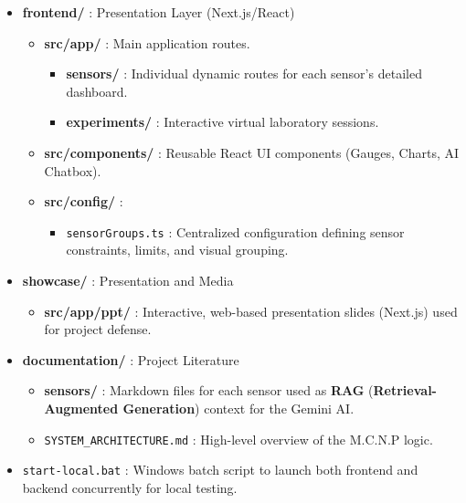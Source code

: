 \documentclass[12pt,a4paper]{article}
\newcommand{\keyword}[1]{\textcolor{keywordcolor}{\textbf{#1}}}
\newcommand{\codeinline}[1]{\texttt{\small #1}}
\begin{document}
\begin{itemize}[label=\textcolor{foldercolor}{\textbf{/}}]
    \item \textbf{\textcolor{foldercolor}{frontend/}} : Presentation Layer (Next.js/React)
    \begin{itemize}[label=--]
        \item \textbf{\textcolor{foldercolor}{src/app/}} : Main application routes.
        \begin{itemize}[label=-]
            \item \textbf{\textcolor{foldercolor}{sensors/}} : Individual dynamic routes for each sensor's detailed dashboard.
            \item \textbf{\textcolor{foldercolor}{experiments/}} : Interactive virtual laboratory sessions.
        \end{itemize}
        \item \textbf{\textcolor{foldercolor}{src/components/}} : Reusable React UI components (Gauges, Charts, AI Chatbox).
        \item \textbf{\textcolor{foldercolor}{src/config/}} : 
        \begin{itemize}[label=-]
            \item \textcolor{filecolor}{\codeinline{sensorGroups.ts}} : Centralized configuration defining sensor constraints, limits, and visual grouping.
        \end{itemize}
    \end{itemize}

    \item \textbf{\textcolor{foldercolor}{showcase/}} : Presentation and Media
    \begin{itemize}[label=--]
        \item \textbf{\textcolor{foldercolor}{src/app/ppt/}} : Interactive, web-based presentation slides (Next.js) used for project defense.
    \end{itemize}

    \item \textbf{\textcolor{foldercolor}{documentation/}} : Project Literature
    \begin{itemize}[label=--]
        \item \textbf{\textcolor{foldercolor}{sensors/}} : Markdown files for each sensor used as \keyword{RAG} (\keyword{Retrieval-Augmented Generation}) context for the Gemini AI.
        \item \textcolor{filecolor}{\codeinline{SYSTEM\_ARCHITECTURE.md}} : High-level overview of the M.C.N.P logic.
    \end{itemize}

    \item \textcolor{filecolor}{\codeinline{start-local.bat}} : Windows batch script to launch both frontend and backend concurrently for local testing.
\end{itemize}
\end{document}
